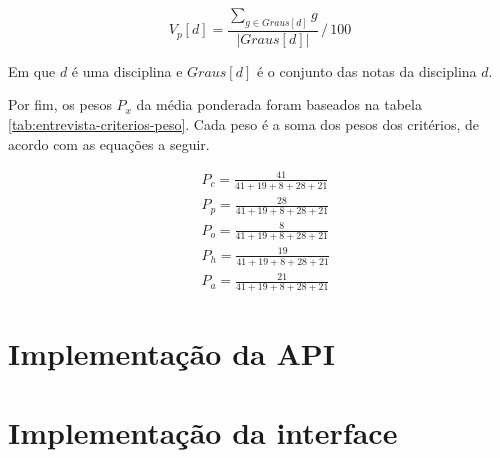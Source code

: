 \begin{equation}
    V_p[d] = \frac{\sum_{g \in Graus[d]} g} {| Graus[d] |} \,/\, 100 
    \label{equ:algoritmo-avaliacao}
\end{equation}

Em que $d$ é uma disciplina e $Graus[d]$ é o conjunto das notas da disciplina $d$.

Por fim, os pesos $P_x$ da média ponderada foram baseados na tabela \ref{tab:entrevista-criterios-peso}. Cada peso é a soma dos pesos dos critérios, de acordo com as equações a seguir.

\begin{align}
    & P_c = \frac{41}{41 + 19 + 8 + 28 + 21} \\[10pt]
    & P_p = \frac{28}{41 + 19 + 8 + 28 + 21} \\[10pt]
    & P_o = \frac{ 8}{41 + 19 + 8 + 28 + 21} \\[10pt]
    & P_h = \frac{19}{41 + 19 + 8 + 28 + 21} \\[10pt]
    & P_a = \frac{21}{41 + 19 + 8 + 28 + 21}
\end{align}


\section{Implementação da API}

\section{Implementação da interface}